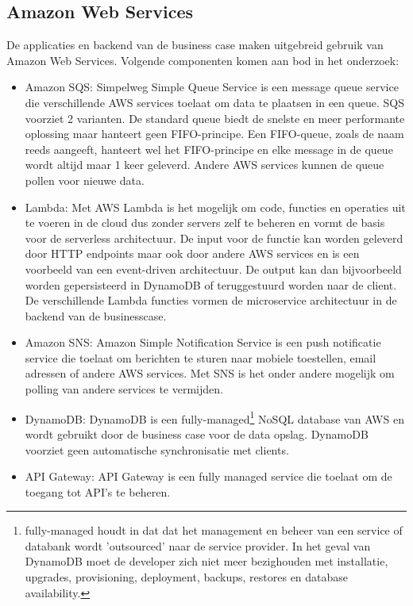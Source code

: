 \subsection{Amazon Web Services}
De applicaties en backend van de business case maken uitgebreid gebruik van Amazon Web Services. Volgende componenten komen aan bod in het onderzoek:
\begin{itemize}
\item Amazon SQS: Simpelweg Simple Queue Service is een message queue service die verschillende AWS services toelaat om data te plaatsen in een queue. SQS voorziet 2 varianten. De standard queue biedt de snelste en meer performante oplossing maar hanteert geen FIFO-principe. Een FIFO-queue, zoals de naam reeds aangeeft, hanteert wel het FIFO-principe en elke message in de queue wordt altijd maar 1 keer geleverd. Andere AWS services kunnen de queue pollen voor nieuwe data.
\item Lambda: Met AWS Lambda is het mogelijk om code, functies en operaties uit te voeren in de cloud dus zonder servers zelf te beheren en vormt de basis voor de serverless architectuur. De input voor de functie kan worden geleverd door HTTP endpoints maar ook door andere AWS services en is een voorbeeld van een event-driven architectuur. De output kan dan bijvoorbeeld worden gepersisteerd in DynamoDB of teruggestuurd worden naar de client. De verschillende Lambda functies vormen de microservice architectuur in de backend van de businesscase.
\item Amazon SNS: Amazon Simple Notification Service is een push notificatie service die toelaat om berichten te sturen naar mobiele toestellen, email adressen of andere AWS services. Met SNS is het onder andere mogelijk om polling van andere services te vermijden.
\item DynamoDB: DynamoDB is een fully-managed\footnote{fully-managed houdt in dat dat het management en beheer van een service of databank wordt 'outsourced' naar de service provider. In het geval van DynamoDB moet de developer zich niet meer bezighouden met installatie, upgrades, provisioning, deployment, backups, restores en database availability.} NoSQL database van AWS en wordt gebruikt door de business case voor de data opslag. DynamoDB voorziet geen automatische synchronisatie met clients.
\item API Gateway: API Gateway is een fully managed service die toelaat om de toegang tot API's te beheren.
\end{itemize}

